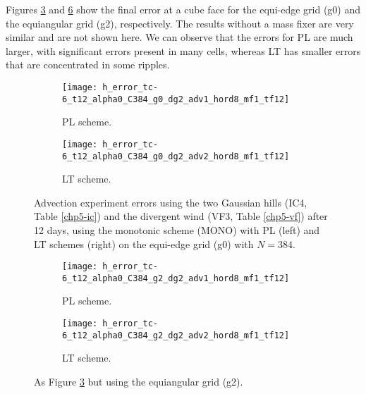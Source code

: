 Figures \ref{chp-advcs-sec-exp-adv4-errors-0} and \ref{chp-advcs-sec-exp-adv4-errors-2} show the final error at a cube face 
for the equi-edge grid (g0) and the equiangular grid (g2), respectively.
The results without a mass fixer are very similar and are not shown here. 
We can observe that the errors for PL are much larger, with significant errors present in many cells, whereas LT has smaller errors that are concentrated in some ripples.

\begin{figure}[!htb]
	\centering
	\begin{subfigure}{0.45\textwidth}
		\centering
		\texttt{[image: h\_error\_tc-6\_t12\_alpha0\_C384\_g0\_dg2\_adv1\_hord8\_mf1\_tf12]}
		\caption{PL scheme.\label{chp-advcs-sec-exp-adv4-errors-0a}}
	\end{subfigure}
	\begin{subfigure}{0.45\textwidth}
		\centering
		\texttt{[image: h\_error\_tc-6\_t12\_alpha0\_C384\_g0\_dg2\_adv2\_hord8\_mf1\_tf12]}
		\caption{LT scheme.\label{chp-advcs-sec-exp-adv4-errors-0b}}
	\end{subfigure}
	\caption{
		Advection experiment errors using the two Gaussian hills (IC4, Table \ref{chp5-ic}) and  the divergent wind (VF3, Table \ref{chp5-vf}) after 12 days, using the monotonic scheme (MONO)
	 with PL (left) and LT schemes (right) on the equi-edge grid (g0) with $N=384$.
	 \label{chp-advcs-sec-exp-adv4-errors-0}}
\end{figure}
\begin{figure}[!htb]
	\centering
	\begin{subfigure}{0.45\textwidth}
		\centering
		\texttt{[image: h\_error\_tc-6\_t12\_alpha0\_C384\_g2\_dg2\_adv1\_hord8\_mf1\_tf12]}
		\caption{PL scheme.\label{chp-advcs-sec-exp-adv4-errors-2a}}
	\end{subfigure}
	\begin{subfigure}{0.45\textwidth}
		\centering
		\texttt{[image: h\_error\_tc-6\_t12\_alpha0\_C384\_g2\_dg2\_adv2\_hord8\_mf1\_tf12]}
		\caption{LT scheme.\label{chp-advcs-sec-exp-adv4-errors-2b}}
	\end{subfigure}
	\caption{As Figure \ref{chp-advcs-sec-exp-adv4-errors-0} but using the equiangular grid (g2).\label{chp-advcs-sec-exp-adv4-errors-2}}
\end{figure}

